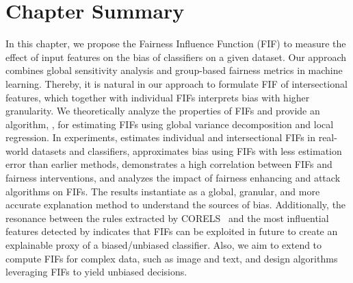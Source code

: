 \section{Chapter Summary}


In this chapter, we propose the Fairness Influence Function (FIF) to measure the effect of input features on the bias of classifiers on a given dataset. Our approach combines global sensitivity analysis and group-based fairness metrics in machine learning. Thereby, it is natural in our approach to formulate FIF of intersectional features, which together with individual FIFs interprets bias with higher granularity. We theoretically analyze the properties of FIFs and provide an algorithm, {\fairXplainer}, for estimating FIFs using global variance decomposition and local regression. In experiments, {\fairXplainer} estimates individual and intersectional FIFs in real-world datasets and classifiers, approximates bias using FIFs with less estimation error than earlier methods, demonstrates a high correlation between FIFs and fairness interventions, and analyzes the impact of fairness enhancing and attack algorithms on FIFs. The results instantiate {\fairXplainer} as a global, granular, and more accurate explanation method to understand the sources of bias. Additionally, the resonance between the rules extracted by CORELS~\cite{rudin2019stop} and the most influential features detected by {\fairXplainer} indicates that FIFs can be exploited in future to create an explainable proxy of a biased/unbiased classifier. Also, we aim to extend {\fairXplainer} to compute FIFs for complex data, such as image and text, and design algorithms leveraging FIFs to yield unbiased decisions.
%